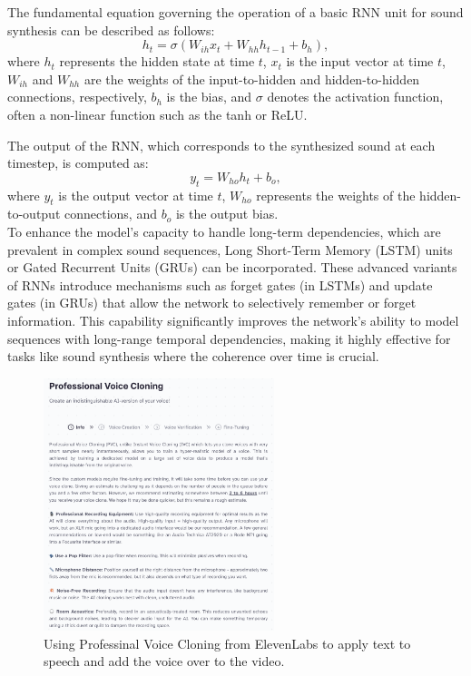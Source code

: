\documentclass[11pt,a4paper,oneside]{report}
\begin{document}
The fundamental equation governing the operation of a basic RNN unit for sound synthesis can be described as follows:
\begin{equation}
h_t = \sigma(W_{ih} x_t + W_{hh} h_{t-1} + b_h),
\end{equation}
where $h_t$ represents the hidden state at time $t$, $x_t$ is the input vector at time $t$, $W_{ih}$ and $W_{hh}$ are the weights of the input-to-hidden and hidden-to-hidden connections, respectively, $b_h$ is the bias, and $\sigma$ denotes the activation function, often a non-linear function such as the tanh or ReLU.

The output of the RNN, which corresponds to the synthesized sound at each timestep, is computed as:
\begin{equation}
y_t = W_{ho} h_t + b_o,
\end{equation}
where $y_t$ is the output vector at time $t$, $W_{ho}$ represents the weights of the hidden-to-output connections, and $b_o$ is the output bias. \\
To enhance the model's capacity to handle long-term dependencies, which are prevalent in complex sound sequences, Long Short-Term Memory (LSTM) \cite{yu2019review} units or Gated Recurrent Units (GRUs) \cite{dey2017gate} can be incorporated. 
These advanced variants of RNNs introduce mechanisms such as forget gates (in LSTMs) and update gates (in GRUs) that allow the network to selectively remember or forget information. 
This capability significantly improves the network's ability to model sequences with long-range temporal dependencies, making it highly effective for tasks like sound synthesis where the coherence over time is crucial.

\begin{figure}[htbp]
  \centering
  \includegraphics[width=0.6\textwidth]{Voice Cloning.png}
  \caption{Using Professinal Voice Cloning from ElevenLabs to apply text to speech and add the voice over to the video.}
\end{figure}
\end{document}
